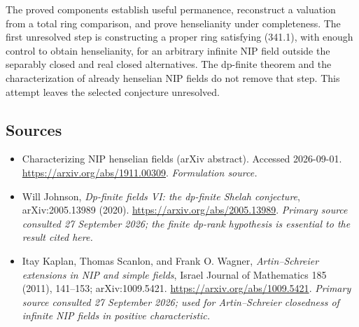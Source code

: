 \documentclass[11pt]{article}
\begin{document}
The proved components establish useful permanence, reconstruct a valuation from a total ring comparison, and prove henselianity under completeness. The first unresolved step is constructing a proper ring satisfying (341.1), with enough control to obtain henselianity, for an arbitrary infinite NIP field outside the separably closed and real closed alternatives. The dp-finite theorem and the characterization of already henselian NIP fields do not remove that step. This attempt leaves the selected conjecture unresolved.

\subsection{Sources}
\begin{itemize}
\item[S1]Characterizing NIP henselian fields (arXiv abstract). Accessed 2026-09-01.
\url{https://arxiv.org/abs/1911.00309}.
\textit{Formulation source.}
\item[E1]Will Johnson, \emph{Dp-finite fields VI: the dp-finite Shelah conjecture}, arXiv:2005.13989 (2020).
\url{https://arxiv.org/abs/2005.13989}.
\textit{Primary source consulted 27 September 2026; the finite dp-rank hypothesis is essential to the result cited here.}
\item[E2]Itay Kaplan, Thomas Scanlon, and Frank O. Wagner, \emph{Artin--Schreier extensions in NIP and simple fields}, Israel Journal of Mathematics 185 (2011), 141--153; arXiv:1009.5421.
\url{https://arxiv.org/abs/1009.5421}.
\textit{Primary source consulted 27 September 2026; used for Artin--Schreier closedness of infinite NIP fields in positive characteristic.}
\end{itemize}
\end{document}

